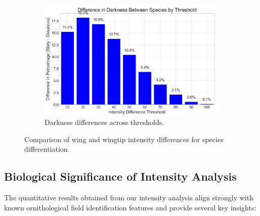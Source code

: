 \documentclass[a4paper,12pt]{report}
\begin{document}
\begin{figure}[H]
    \hfill
    \begin{subfigure}[b]{0.32\textwidth}
        \centering
        \includegraphics[width=\textwidth]{images/REPORT_IMAGES_INTENSITY/I1/diffbythresh.png}
        \caption{Darkness differences across thresholds.}
        \label{fig:diff_by_thresh}
    \end{subfigure}
    \caption{Comparison of wing and wingtip intensity differences for species differentiation.}
    \label{fig:wingtip_contrast_combined}
\end{figure}

\subsection{Biological Significance of Intensity Analysis}
The quantitative results obtained from our intensity analysis align strongly with known ornithological field identification features and provide several key insights:
\end{document}
